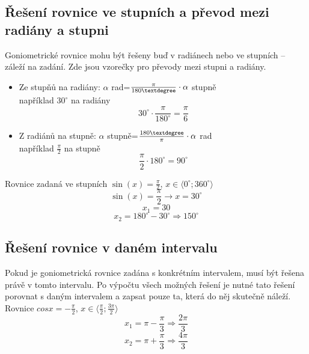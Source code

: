 \subsection{Řešení rovnice ve stupních a převod mezi radiány a stupni}
Goniometrické rovnice mohu být řešeny buď v radiánech nebo ve stupních – záleží na zadání. Zde jsou vzorečky pro převody mezi stupni a radiány.

\begin{itemize}
    \item Ze stupňů na radiány: $\alpha$ rad=$\frac{\pi}{180\textdegree}\cdot\alpha$ stupně
\\ například $30^\circ$ na radiány
$$
    30^\circ \cdot\frac{\pi}{180^\circ}=\frac{\pi}{6}
$$
    \item Z radiánů na stupně: $\alpha$ stupně=$\frac{180\textdegree}{\pi}\cdot\alpha$ rad
\\ například $\frac{\pi}{2}$ na stupně
$$
    \frac{\pi}{2} \cdot 180^\circ=90^\circ
$$
\end{itemize}

Rovnice zadaná ve stupních $\sin(x)=\frac{\pi}{2}$, $x\in\langle0 ^\circ;360^\circ \rangle$
$$\sin(x)=\frac{\pi}{2} \rightarrow x=30^\circ$$
$$x_1=30$$
$$x_2=180^\circ-30^\circ\Rightarrow150^\circ$$
\subsection{Řešení rovnice v daném intervalu}
Pokud je goniometrická rovnice zadána s konkrétním intervalem, musí být řešena právě v tomto intervalu. Po výpočtu všech možných řešení je nutné tato řešení porovnat s daným intervalem a zapsat pouze ta, která do něj skutečně náleží.
Rovnice $cosx=-\frac{\pi}{2}$, $x\in\langle\frac{\pi}{2};\frac{3\pi}{2}\rangle$
$$x_1=\pi-\frac{\pi}{3}\Rightarrow\frac{2\pi}{3}$$
$$x_2=\pi+\frac{\pi}{3}\Rightarrow\frac{4\pi}{3}$$
